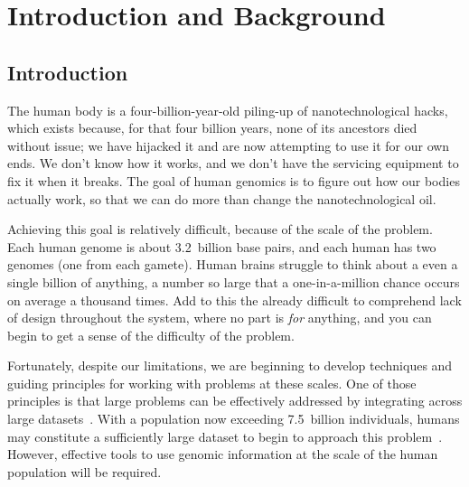 \chapter{Introduction and Background}

\section{Introduction}

The human body is a four-billion-year-old piling-up of nanotechnological hacks, which exists because, for that four billion years, none of its ancestors died without issue; we have hijacked it and are now attempting to use it for our own ends. We don't know how it works, and we don't have the servicing equipment to fix it when it breaks. The goal of human genomics is to figure out how our bodies actually work, so that we can do more than change the nanotechnological oil.

Achieving this goal is relatively difficult, because of the scale of the problem. Each human genome is about 3.2~billion base pairs, and each human has two genomes (one from each gamete). %
Human brains struggle to think about a even a single billion of anything, a number so large that a one-in-a-million chance occurs on average a thousand times. Add to this the already difficult to comprehend lack of design throughout the system, where no part is \textit{for} anything, and you can begin to get a sense of the difficulty of the problem.

Fortunately, despite our limitations, we are beginning to develop techniques and guiding principles for working with problems at these scales. One of those principles is that large problems can be effectively addressed by integrating across large datasets~\cite{halevy2009unreasonable}. With a population now exceeding 7.5~billion individuals, humans may constitute a sufficiently large dataset to begin to approach this problem~\cite{talton2017economics}. However, effective tools to use genomic information at the scale of the human population will be required.

